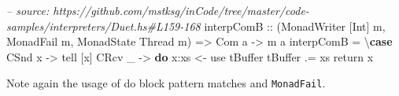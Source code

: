 \documentclass[]{article}
\newenvironment{Shaded}{}{}
\newcommand{\KeywordTok}[1]{\textcolor[rgb]{0.00,0.44,0.13}{\textbf{#1}}}
\newcommand{\DataTypeTok}[1]{\textcolor[rgb]{0.56,0.13,0.00}{#1}}
\newcommand{\CommentTok}[1]{\textcolor[rgb]{0.38,0.63,0.69}{\textit{#1}}}
\newcommand{\OtherTok}[1]{\textcolor[rgb]{0.00,0.44,0.13}{#1}}
\newcommand{\FunctionTok}[1]{\textcolor[rgb]{0.02,0.16,0.49}{#1}}
\newcommand{\NormalTok}[1]{#1}
\begin{document}
\begin{Shaded}
\begin{Highlighting}[]
\CommentTok{-- source: https://github.com/mstksg/inCode/tree/master/code-samples/interpreters/Duet.hs#L159-168}
\NormalTok{interpComB}
\OtherTok{    ::}\NormalTok{ (}\DataTypeTok{MonadWriter}\NormalTok{ [}\DataTypeTok{Int}\NormalTok{] m, }\DataTypeTok{MonadFail}\NormalTok{ m, }\DataTypeTok{MonadState} \DataTypeTok{Thread}\NormalTok{ m)}
    \OtherTok{=>} \DataTypeTok{Com}\NormalTok{ a}
    \OtherTok{->}\NormalTok{ m a}
\NormalTok{interpComB }\FunctionTok{=}\NormalTok{ \textbackslash{}}\KeywordTok{case}
    \DataTypeTok{CSnd}\NormalTok{ x }\OtherTok{->}\NormalTok{ tell [x]}
    \DataTypeTok{CRcv}\NormalTok{ _ }\OtherTok{->} \KeywordTok{do}
\NormalTok{      x}\FunctionTok{:}\NormalTok{xs }\OtherTok{<-}\NormalTok{ use tBuffer}
\NormalTok{      tBuffer }\FunctionTok{.=}\NormalTok{ xs}
\NormalTok{      return x}
\end{Highlighting}
\end{Shaded}

Note again the usage of do block pattern matches and \texttt{MonadFail}.
\end{document}
